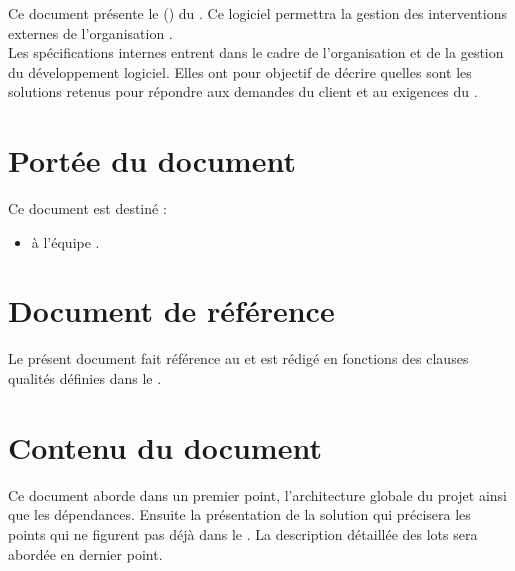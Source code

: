 Ce document présente le \DSI{} (\DSICourt) du \PIC{} \nomPIC. Ce logiciel permettra la gestion des interventions externes de l'organisation \nomClient. \\

	Les spécifications internes entrent dans le cadre de l'organisation et de la gestion du développement logiciel. Elles ont pour objectif de décrire quelles sont les solutions retenus pour répondre aux demandes du client et au exigences du \DSEcourt{}. 
	
\section*{Portée du document}
	Ce document est destiné :
	\begin{itemize}
		\item à l'équipe \PICCourt{} \nomEquipe.
	\end{itemize}
	
\section*{Document de référence}
	Le présent document fait référence au \DSE{} et est rédigé en fonctions des clauses qualités définies dans le \PQ.
	
\section*{Contenu du document}
	Ce document aborde dans un premier point, l'architecture globale du projet ainsi que les dépendances. Ensuite la présentation de la solution qui précisera les points qui ne figurent pas déjà dans le \DSECourt{}. La description détaillée des lots sera abordée en dernier point.